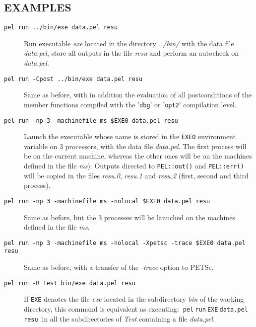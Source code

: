 \documentclass{article}
\begin{document}
\subsection*{EXAMPLES\label{run_EXAMPLES}}
\begin{description}

\item[\texttt{pel run  ../bin/exe data.pel resu}] \mbox{}

Run executable \emph{exe} located in the directory \emph{../bin/}
with the data file \emph{data.pel}, store
all outputs in the file \emph{resu} and perform an autocheck on \emph{data.pel}.


\item[\texttt{pel run -Cpost ../bin/exe data.pel resu}] \mbox{}

Same as before, with in addition the evaluation of all postconditions
of the member functions compiled with the '\texttt{dbg}' or '\texttt{opt2}'
compilation level.


\item[\texttt{pel run -np 3 -machinefile ms \$EXE0 data.pel resu}] \mbox{}

Launch the executable whose name is stored in the \texttt{EXEO} environment
variable on 3 processors, with the data file \emph{data.pel}.
The first process will be on the current machine, whereas the other ones will
be on the machines defined in the file \emph{ms}).
Outputs directed to \texttt{PEL::out()}
and \texttt{PEL::err()} will be copied in the files \emph{resu.0}, \emph{resu.1}
and \emph{resu.2} (first, second and third process).


\item[\texttt{pel run -np 3 -machinefile ms -nolocal \$EXE0 data.pel resu}] \mbox{}

Same as before, but the 3 processes will be launched on the machines defined
in the file \emph{ms}.


\item[\texttt{pel run -np 3 -machinefile ms -nolocal -Xpetsc -trace \$EXE0 data.pel resu}] \mbox{}

Same as before, with a transfer of the \emph{-trace} option to PETSc.


\item[\texttt{pel run -R Test bin/exe data.pel resu}] \mbox{}

If \texttt{EXE} denotes the file \emph{exe} located in the subdirectory
\emph{bin} of the working directory, this command is equivalent as
executing: $\:$\texttt{pel$\:$run$\:$EXE$\:$data.pel$\:$resu}$\:$
in all the subdirectories of \emph{Test} containing
a file \emph{data.pel}.



\end{description}
\end{document}
